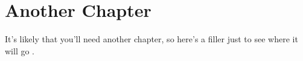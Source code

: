 \chapter{Another Chapter}

It's likely that you'll need another chapter, so here's a filler just to see
where it will go \cite{sample}.
